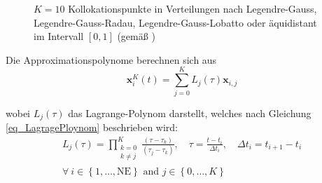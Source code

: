 \begin{figure}[h!]
    \centering
    \setlength{\fboxsep}{1pt}
    \setlength{\fboxrule}{1pt}
    \caption[$K=10$ Kollokationspunkte in Verteilungen nach Legendre-Gauss, Legendre-Gauss-Radau, Legendre-Gauss-Lobatto oder äquidistant im Intervall {$\left[0,1\right]$}]{$K=10$ Kollokationspunkte in Verteilungen nach Legendre-Gauss, Legendre-Gauss-Radau, Legendre-Gauss-Lobatto oder äquidistant im Intervall $\left[0,1\right]$ (gemäß \cite[S.48]{Huntington})}
    \label{fig_Kollokationspunkte}
\end{figure}

Die Approximationspolynome berechnen sich aus
\begin{equation} \label{eq_Approxpolynom2}
    \boldsymbol{x}_i^{K}(t)=\sum_{j=0}^K L_j(\tau) \boldsymbol{x}_{i, j}
\end{equation}

\vspace*{-\baselineskip}wobei $L_j(\tau)$ das Lagrange-Polynom darstellt, welches nach Gleichung \ref{eq_LagragePloynom} beschrieben wird:
\begin{equation} \label{eq_LagragePloynom}
    \begin{gathered}
        L_j(\tau)=\prod_{\substack{k=0 \\ k \neq j}}^K \frac{\left(\tau-\tau_k\right)}{\left(\tau_j-\tau_k\right)}, \quad \tau=\frac{t-t_i}{\Delta t_i}, \quad \Delta t_i=t_{i+1}-t_i\\
        \forall~i\in \left\{1, \ldots, \mathrm{NE}\right\} \text{ and } j\in \left\{0, \ldots, K\right\}
    \end{gathered}
\end{equation}

